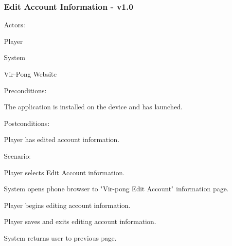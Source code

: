 \documentclass[12pt]{article}
\newenvironment{itemize*}%
  {\begin{itemize}%
  	\setlength{\parsep}{0pt}
    \setlength{\itemsep}{0pt}%
    \setlength{\parskip}{0pt}}%
  {\end{itemize}}
\newenvironment{enumerate*}%
  {\begin{enumerate}%
  	\setlength{\parsep}{0pt}
    \setlength{\itemsep}{0pt}%
    \setlength{\parskip}{0pt}}%
  {\end{enumerate}}
\begin{document}
\subsubsection*{Edit Account Information - v1.0}
Actors:
\begin{itemize*}
\item Player
\item System
\item Vir-Pong Website
\end{itemize*}
Preconditions:
\begin{itemize*}
\item The application is installed on the device and has launched.
\end{itemize*}
Postconditions:
\begin{itemize*}
\item Player has edited account information.
\end{itemize*}
Scenario:
\begin{enumerate*}
\item Player selects Edit Account information.
\item \label{Browser}System opens phone browser to "Vir-pong Edit Account" information page. 
\item Player begins editing account information.
\item Player saves and exits editing account information.
\item System returns user to previous page.
\end{enumerate*} 

\onehalfspacing


\end{document}
